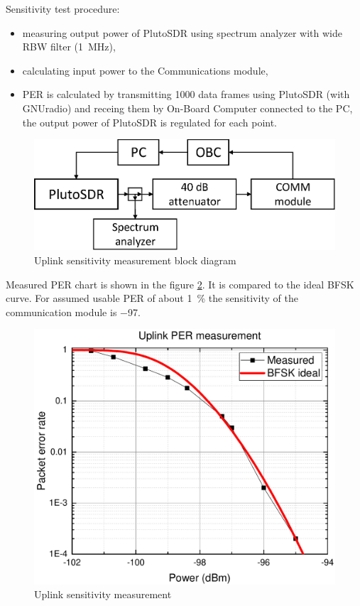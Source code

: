 Sensitivity test procedure:
\begin{itemize}
    \item measuring output power of PlutoSDR using spectrum analyzer with wide RBW filter (\SI{1}{\MHz}),
    \item calculating input power to the Communications module,
    \item PER is calculated by transmitting \si{1000} data frames using PlutoSDR (with GNUradio) and receing them by On-Board Computer connected to the PC, the output power of PlutoSDR is regulated for each point.
\end{itemize}

\begin{figure}[h]
    \centering
    \includegraphics[width=0.6\paperwidth]{img/6/uplink_sensitivity.eps}
    \caption{Uplink sensitivity measurement block diagram}
    \label{4_uplink_sensitivity}
\end{figure}

Measured PER chart is shown in the figure \ref{4_uplink_sensitivity_graph}. It is compared to the ideal BFSK curve. For assumed usable PER of about \SI{1}{\percent} the sensitivity of the communication module is \SI{-97}{\dBm}.

\begin{figure}[H]
    \centering
    \includegraphics[width=0.8\paperwidth]{img/6/uplink_per.pdf}
    \caption{Uplink sensitivity measurement}
    \label{4_uplink_sensitivity_graph}
\end{figure}



